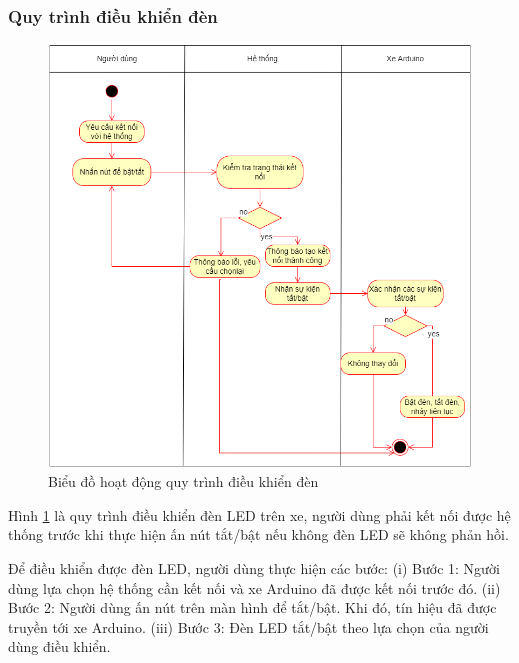 \documentclass[../DoAn.tex]{subfiles}
\begin{document}
\subsubsection{Quy trình điều khiển đèn}
\label{subsection:2.2.3.2}
\begin{figure}[H]
    \includegraphics[scale = 0.6]{Hinhve/activity_dieu_khien_den.png}
    \centering
    \caption{Biểu đồ hoạt động quy trình điều khiển đèn}
    \label{fig:2.2.3.2}
\end{figure}

Hình \ref{fig:2.2.3.2} là quy trình điều khiển đèn LED trên xe, người dùng phải kết nối được hệ thống trước khi thực hiện ấn nút tắt/bật nếu không đèn LED sẽ không phản hồi.

Để điều khiển được đèn LED, người dùng thực hiện các bước: (i) Bước 1: Người dùng lựa chọn hệ thống cần kết nối và xe Arduino đã được kết nối trước đó. (ii) Bước 2: Người dùng ấn nút trên màn hình để tắt/bật. Khi đó, tín hiệu đã được truyền tới xe Arduino. (iii) Bước 3: Đèn LED tắt/bật theo lựa chọn của người dùng điều khiển.
\end{document}
